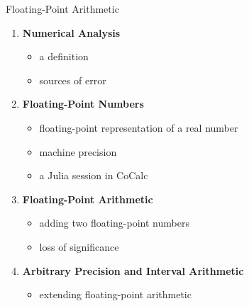 \documentclass{beamer}
\begin{document}
\begin{frame}{Floating-Point Arithmetic}
    \begin{enumerate}
        \item<1-> \textbf{Numerical Analysis}
        \begin{itemize}
            \item a definition
            \item sources of error
        \end{itemize}
        \item<2-> \textbf{Floating-Point Numbers}
        \begin{itemize}
            \item floating-point representation of a real number
            \item machine precision
            \item a Julia session in CoCalc
        \end{itemize}
        \item<3-> \textbf{Floating-Point Arithmetic}
        \begin{itemize}
            \item adding two floating-point numbers
            \item loss of significance
        \end{itemize}
        \item<4-> \textbf{Arbitrary Precision and Interval Arithmetic}
        \begin{itemize}
            \item extending floating-point arithmetic
        \end{itemize}
    \end{enumerate}
\end{frame}
\end{document}

